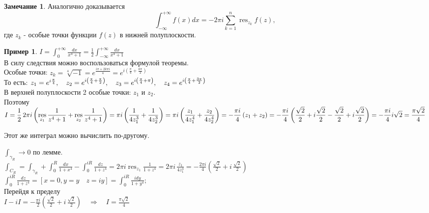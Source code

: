 \documentclass[a4paper, 12pt]{article}
\DeclareMathOperator*{\res}{res}
\theoremstyle{definition}
\newtheorem*{remark}{Замечание}
\theoremstyle{definition}
\newtheorem*{example}{Пример}
\theoremstyle{plain}
\theoremstyle{plain}
\theoremstyle{plain}
\begin{document}
\begin{remark}
    Аналогично доказывается
    \begin{equation*}
        \int_{-\infty}^{+\infty} f(x)dx = -2\pi i \sum_{k=1}^n \res_{z_k} f(z),
    \end{equation*}
    где $z_k$ - особые точки функции $f(z)$ в нижней полуплоскости.
\end{remark}
\begin{example}
    $\displaystyle I=\int_0^{+\infty} \frac{dx}{x^4+1}=\frac{1}{2}\int_{-\infty}^{+\infty} \frac{dx}{x^4+1}$ \\
    
    В силу следствия можно воспользоваться формулой теоремы. \\
    Особые точки: $\displaystyle z_k=\sqrt[4]{-1} = e^{\frac{i\pi+2k\pi i}{4}} = e^{i \left(\frac{\pi}{4}+\frac{k\pi}{2}\right)}$ \\
    То есть: $z_1=e^{i {\pi \over 4}}, \quad z_2=e^{i \left(\frac{\pi}{4} + \frac{\pi}{2}\right)}, \quad
    z_3=e^{i \left(\frac{\pi}{4} + \pi\right)}, \quad z_4=e^{i \left(\frac{\pi}{4} + \frac{3\pi}{2}\right)}$ \\
    В верхней полуплоскости 2 особые точки: $z_1$ и $z_2$.\\
    Поэтому $\displaystyle I={1 \over 2} \, 2\pi i \left(\res_{z_1} \frac{1}{z^4+1} + \res_{z_2} \frac{1}{z^4+1}\right) = 
    \pi i \left(\frac{1}{4z_1^3} + \frac{1}{4z_2^3}\right) = \pi i \left(\frac{z_1}{4z_1^4} + \frac{z_2}{4z_2^4}\right) = 
    -\frac{\pi i}{4} \left(z_1 + z_2\right) = -\frac{\pi i}{4} \left(\frac{\sqrt{2}}{2} + i\frac{\sqrt{2}}{2} - \frac{\sqrt{2}}{2} + i\frac{\sqrt{2}}{2}\right) = 
    -\frac{\pi i}{4} i \sqrt{2} = \frac{\pi \sqrt{2}}{4}$

    Этот же интеграл можно вычислить по-другому. \\
    \begin{center}
    \end{center}
    $\displaystyle \int_{\gamma_R} \to 0$ по лемме. \\
    $\displaystyle \int_{C_R} = \int_{\gamma_R} + \int_0^R \frac{dx}{1+x^4} - \int_0^{iR} \frac{dz}{1+z^4} = 
    2 \pi i \res_{z_1} \frac{1}{1+z^4} = 2\pi i \, \frac{z_1}{4z_1^4} = -\frac{2\pi i}{4} \left(\frac{\sqrt 2}{2} + i \, \frac{\sqrt 2}{2}\right)$ \\
    $\displaystyle \int_0^{iR} \frac{dz}{1+z^4} = \left[x=0, y=y \quad z=iy\right] = \int_0^{iR} \frac{idy}{1+y^4};$ \\
    Перейдя к пределу \\
    $\displaystyle I-iI = -\frac{\pi i}{2} \left(\frac{\sqrt 2}{2} + i \, \frac{\sqrt 2}{2}\right) \quad \Rightarrow \quad I=\frac{\pi\sqrt 2}{4}$
\end{example}
\end{document}
